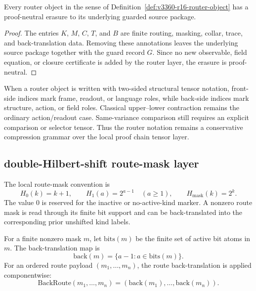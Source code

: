 \begin{lemma}
\label{lem:v3360-r16-router-object-erasure}
Every router object in the sense of Definition~\ref{def:v3360-r16-router-object} has a proof-neutral erasure to its underlying guarded source package.
\end{lemma}

\begin{proof}
The entries $K$, $M$, $C$, $T$, and $B$ are finite routing, masking, collar, trace, and back-translation data. Removing these annotations leaves the underlying source package together with the guard record $G$. Since no new observable, field equation, or closure certificate is added by the router layer, the erasure is proof-neutral.
\end{proof}

\begin{remark}
\label{rem:v3360-r16-router-two-sided-relation}
When a router object is written with two-sided structural tensor notation, front-side indices mark frame, readout, or language roles, while back-side indices mark structure, action, or field roles. Classical upper--lower contraction remains the ordinary action/readout case. Same-variance comparison still requires an explicit comparison or selector tensor. Thus the router notation remains a conservative compression grammar over the local proof chain tensor layer.
\end{remark}

\subsection*{double-Hilbert-shift route-mask layer}
\label{subsec:v3360-r16-double-hilbert-shift-route-mask-layer}

\begin{definition}
\label{def:v3360-r16-double-hilbert-shift-route-mask-convention}
The local route-mask convention is
\[
 H_0(k)=k+1,
 \qquad
 H_1(a)=2^{a-1}\quad(a\geq 1),
 \qquad
 H_{\mathrm{mask}}(k)=2^k.
\]
The value $0$ is reserved for the inactive or no-active-kind marker. A nonzero route mask is read through its finite bit support and can be back-translated into the corresponding prior unshifted kind labels.
\end{definition}

\begin{definition}
\label{def:v3360-r16-mask-support-backtranslation}
For a finite nonzero mask $m$, let $\mathrm{bits}(m)$ be the finite set of active bit atoms in $m$. The back-translation map is
\[
 \mathrm{back}(m)=\{a-1 : a\in \mathrm{bits}(m)\}.
\]
For an ordered route payload $(m_1,\ldots,m_n)$, the route back-translation is applied componentwise:
\[
 \mathrm{BackRoute}(m_1,\ldots,m_n)
 =
 (\mathrm{back}(m_1),\ldots,\mathrm{back}(m_n)).
\]
\end{definition}

